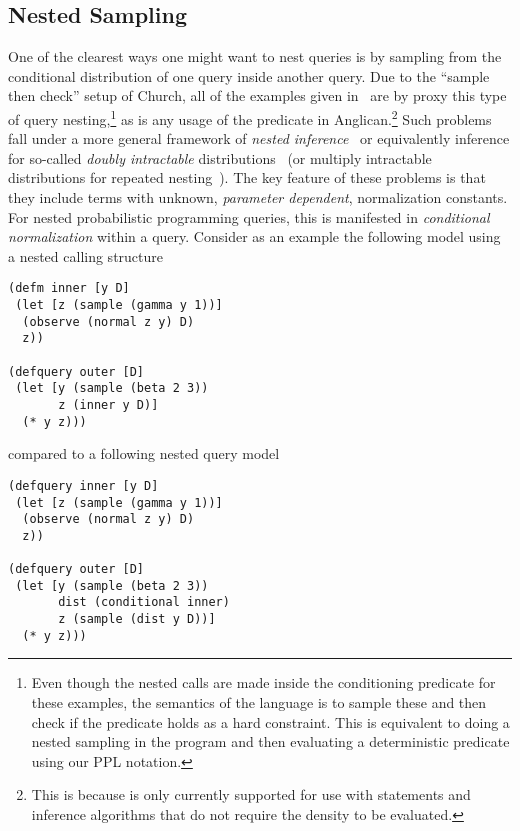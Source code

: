\subsection{Nested Sampling}
\label{sec:nest:imp:sampling}

One of the clearest ways one might want to nest queries is by sampling from the conditional
distribution of one query inside another query.  Due to the ``sample then check'' setup of
Church, all of the examples given in~\cite{stuhlmuller2014reasoning} are by proxy this
type of query nesting,\footnote{Even though the nested calls are made inside the conditioning
	predicate for these examples, the semantics of the language is to sample these
	and then check if the predicate holds as a hard constraint.  This is equivalent to doing a nested
	sampling in the program and then evaluating a deterministic predicate using our PPL notation.}
as is any usage of the \conditional predicate in Anglican.\footnote{This is because 
	 is only currently supported for use
with  statements and inference algorithms that do not require the density to be evaluated.}
Such problems fall under a more general framework of \emph{nested inference}~\cite{mantadelis2011nesting} or equivalently inference for so-called
\emph{doubly intractable} distributions~\citep{murray2006mcmc} (or multiply intractable
	distributions for repeated nesting~\citep{stuhlmuller2014reasoning}).
	 The key feature of these problems is that they include
terms with unknown, \emph{parameter dependent}, normalization constants.  For nested probabilistic programming
queries, this is manifested in \emph{conditional normalization} within a query.
Consider as an example the following model using a nested calling structure
\vspace{-15pt}
\begin{lstlisting}[basicstyle=\ttfamily\footnotesize,multicols=2,frame=none]
(defm inner [y D]
 (let [z (sample (gamma y 1))]
  (observe (normal z y) D)
  z))

(defquery outer [D]
 (let [y (sample (beta 2 3))
       z (inner y D)]
  (* y z)))
\end{lstlisting}
\vspace{-25pt}
compared to a following nested query model
\vspace{-15pt}
\begin{lstlisting}[basicstyle=\ttfamily\footnotesize,multicols=2,frame=none]
(defquery inner [y D]
 (let [z (sample (gamma y 1))]
  (observe (normal z y) D)
  z))
  
(defquery outer [D]
 (let [y (sample (beta 2 3))
       dist (conditional inner)
       z (sample (dist y D))]
  (* y z)))
\end{lstlisting}
